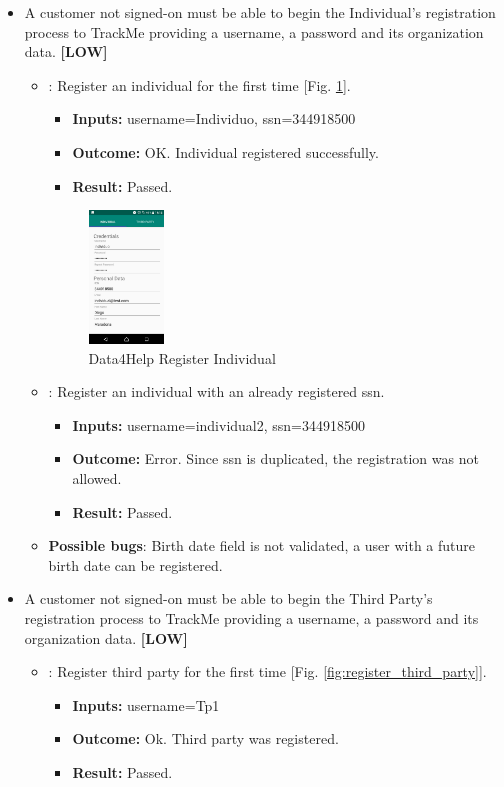 \documentclass[a4paper, hidelinks, 12pt]{report}
\newcommand\requirement[1]{\item[{[REQ-#1]}] }
\newcommand\test[1]{\item[{[TEST-#1]}] }
\begin{document}
	\begin{itemize}
		\requirement{1} A customer not signed-on must be able to begin the Individual’s registration process to TrackMe providing a username, a password and its organization data.  \textbf{[LOW]}
		
	\begin{itemize}
		\test{1}: Register an individual for the first time [Fig. \ref{fig:register_individual}].
			\begin{itemize}
			\item \textbf{Inputs: } username=Individuo, ssn=344918500			
			\item \textbf{Outcome: } OK. Individual registered successfully. 
			\item \textbf{Result: } Passed. 
			\end{itemize}
			
		\begin{figure}[H]
					\centering
				\includegraphics[width=0.2\textwidth]{images/register_individual.jpeg}
					\caption[Data4Help Register Individual]{Data4Help Register Individual}
				\label{fig:register_individual}
			\end{figure}
			
		\test{2}: Register an individual with an already registered ssn.
			\begin{itemize}
			\item \textbf{Inputs: } username=individual2, ssn=344918500
			\item \textbf{Outcome: } Error. Since ssn is duplicated, the registration was not allowed.
			\item \textbf{Result: } Passed. 
			 \end{itemize}	
			 
		\item \textbf{Possible bugs}: Birth date field is not validated, a user with a future birth date can be registered.
	\end{itemize}
	
		\requirement{2} A customer not signed-on must be able to begin the Third Party’s registration process to TrackMe providing a username, a password and its organization data. \textbf{[LOW]}
		\begin{itemize}
		\test{3}: Register third party for the first time [Fig. \ref{fig:register_third_party}].
			\begin{itemize}
			\item \textbf{Inputs: } username=Tp1			
			\item \textbf{Outcome: } Ok. Third party was registered.
			\item \textbf{Result: } Passed. 
			\end{itemize}
			

\end{itemize}
\end{itemize}
\end{document}
